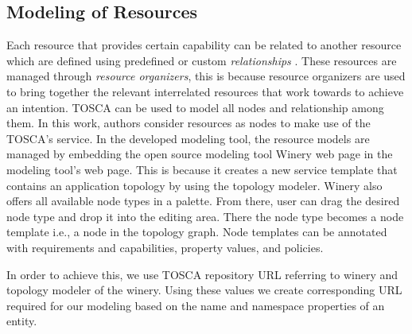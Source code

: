 \subsection{Modeling of Resources}
Each resource that provides certain capability can be related to another resource which are defined using predefined or custom \textit{relationships} \cite{Sungur2014a}. These resources are managed through \textit{resource organizers}, this is because resource organizers are used to bring together the relevant interrelated resources that work towards to achieve an intention. TOSCA \cite{Binz2014} can be used to model all nodes and relationship among them. In this work, authors consider resources as nodes to make use of the TOSCA's service. In the developed modeling tool, the resource models are managed by embedding the open source modeling tool Winery web page \cite{Kopp2013} in the modeling tool's web page. This is because it creates a new service template that contains an application topology by using the topology modeler. Winery also offers all available node types in a palette. From there, user can drag the desired node type and drop it into the editing area. There the node type becomes a node template i.e., a node in the topology graph. Node templates can be annotated with requirements and capabilities, property values, and policies.

In order to achieve this, we use TOSCA repository URL referring to winery and topology modeler of the winery. Using these values we create corresponding URL required for our modeling based on the name and namespace properties of an entity. 

